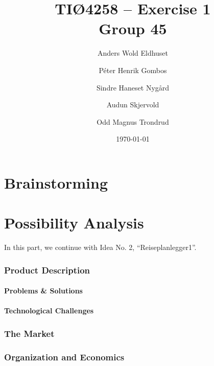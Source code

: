 \documentclass[a4paper]{article}
\title{TIØ4258 -- Exercise 1 \\ Group 45}
\author{
    Anders Wold Eldhuset \and
    Péter Henrik Gombos \and
    Sindre Haneset Nygård \and
    Audun Skjervold \and
    Odd Magnus Trondrud
}
\date{\today}
\begin{document}
    \maketitle
    \newpage

    \setcounter{secnumdepth}{2}
    \tableofcontents
    \newpage
    \part{Brainstorming}
    	
    \newpage

    \part{Possibility Analysis}
    	In this part, we continue with Idea No. 2, ``Reiseplanlegger1''.
    	\section{Product Description}
    		\subsection{Problems \& Solutions}
	    		
    		\subsection{Technological Challenges}
	    			
	    \section{The Market} %
            

            

            

            

	    \section{Organization and Economics}
            
\end{document}

